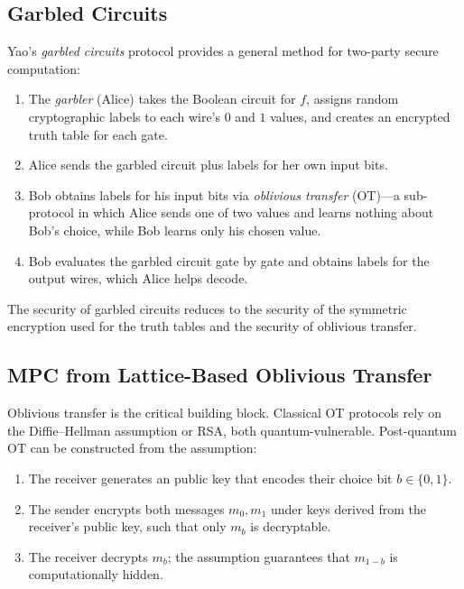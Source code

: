 \subsection{Garbled Circuits}
\label{subsec:garbled-circuits}

Yao's \emph{garbled circuits} protocol provides a general method for two-party secure computation:

\begin{enumerate}
\item The \emph{garbler} (Alice) takes the Boolean circuit for $f$, assigns random cryptographic labels to each wire's $0$ and $1$ values, and creates an encrypted truth table for each gate.
\item Alice sends the garbled circuit plus labels for her own input bits.
\item Bob obtains labels for his input bits via \emph{oblivious transfer} (OT)---a sub-protocol in which Alice sends one of two values and learns nothing about Bob's choice, while Bob learns only his chosen value.
\item Bob evaluates the garbled circuit gate by gate and obtains labels for the output wires, which Alice helps decode.
\end{enumerate}

The security of garbled circuits reduces to the security of the symmetric encryption used for the truth tables and the security of oblivious transfer.


\subsection{MPC from Lattice-Based Oblivious Transfer}
\label{subsec:lattice-ot}

Oblivious transfer is the critical building block.  Classical OT protocols rely on the Diffie--Hellman assumption or RSA, both quantum-vulnerable.  Post-quantum OT can be constructed from the \lwe{} assumption:

\begin{enumerate}
\item The receiver generates an \lwe{} public key that encodes their choice bit $b \in \{0,1\}$.
\item The sender encrypts both messages $m_0, m_1$ under keys derived from the receiver's public key, such that only $m_b$ is decryptable.
\item The receiver decrypts $m_b$; the \lwe{} assumption guarantees that $m_{1-b}$ is computationally hidden.
\end{enumerate}

